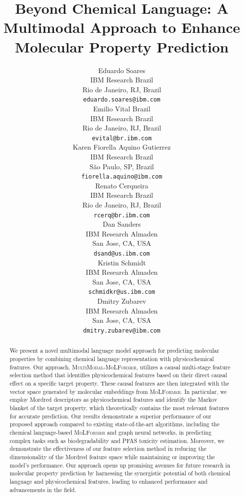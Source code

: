 \documentclass{article}
\title{Beyond Chemical Language: A Multimodal Approach to Enhance Molecular Property Prediction}
\author{%
  Eduardo Soares\\
  IBM Research Brazil \\
  Rio de Janeiro, RJ, Brazil \\
  \texttt{eduardo.soares@ibm.com}\\ 
  \And
  Emilio Vital Brazil \\
  IBM Research Brazil \\
  Rio de Janeiro, RJ, Brazil \\
  \texttt{evital@br.ibm.com} \\
  \And
  Karen Fiorella Aquino Gutierrez \\
  IBM Research Brazil \\
  São Paulo, SP, Brazil \\
  \texttt{fiorella.aquino@ibm.com}\\ 
  \And
  Renato Cerqueira\\
  IBM Research Brazil \\
  Rio de Janeiro, RJ, Brazil \\
  \texttt{rcerq@br.ibm.com} \\
  \And
  Dan Sanders \\
  IBM Research Almaden \\
  San Jose, CA, USA \\
  \texttt{dsand@us.ibm.com} \\
  \And
  Kristin Schmidt \\
  IBM Research Almaden \\
  San Jose, CA, USA \\
  \texttt{schmidkr@us.ibm.com} \\ 
  \And
    Dmitry Zubarev \\
  IBM Research Almaden \\
  San Jose, CA, USA \\
  \texttt{dmitry.zubarev@ibm.com}\\ 
}
\begin{document}
\maketitle


\begin{abstract}
We present a novel multimodal language model approach for predicting molecular properties by combining chemical language representation with physicochemical features.
Our approach, \textsc{MultiModal}-\textsc{MoLFormer}, utilizes a causal multi-stage feature selection method that identifies physicochemical features based on their direct causal effect on a specific target property. 
These causal features are then integrated with the vector space generated by molecular embeddings from \textsc{MoLFormer}. 
In particular, we employ Mordred descriptors as physicochemical features and identify the Markov blanket of the target property, which theoretically contains the most relevant features for accurate prediction. 
Our results demonstrate a superior performance of our proposed approach compared to existing state-of-the-art algorithms, including the chemical language-based \textsc{MoLFormer} and graph neural networks, in predicting complex tasks such as biodegradability and PFAS toxicity estimation. 
Moreover, we demonstrate the effectiveness of our feature selection method in reducing the dimensionality of the Mordred feature space while maintaining or improving the model's performance. 
Our approach opens up promising avenues for future research in molecular property prediction by harnessing the synergistic potential of both chemical language and physicochemical features, leading to enhanced performance and advancements in the field.
\end{abstract}
\end{document}
